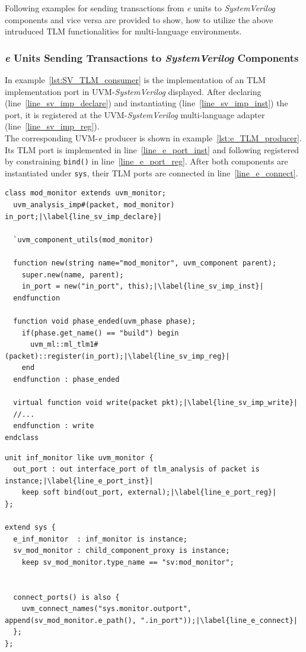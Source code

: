 Following examples for sending transactions from \textit{e} units to \emph{SystemVerilog} components and
vice versa are provided to show, how to utilize the above intruduced TLM functionalities for multi-language
environments.
\subsubsection{\textit{e} Units Sending Transactions to \emph{SystemVerilog} Components}
In example~\ref{lst:SV_TLM_consumer} is the implementation of an TLM implementation port in UVM-\emph{SystemVerilog}
displayed. After declaring (line~\ref{line_sv_imp_declare}) and instantiating (line~\ref{line_sv_imp_inst}) the port, it
is registered at the UVM-\emph{SystemVerilog} multi-language adapter (line~\ref{line_sv_imp_reg}).\\
The corresponding UVM-\textit{e} producer is shown in example~\ref{lst:e_TLM_producer}. Its TLM port is implemented in
line~\ref{line_e_port_inst} and following registered by constraining \lstinline$bind()$ in line~\ref{line_e_port_reg}.
After both components are instantiated under \lstinline$sys$, their TLM ports are connected in line~\ref{line_e_connect}.
\lstset{language=SystemVerilog, numbers = left, escapechar=|, breaklines=true}
\begin{lstlisting}[frame=htrbl, caption={SystemVerilog: consumer side of an TLM connection},
label={lst:SV_TLM_consumer}]
class mod_monitor extends uvm_monitor;
  uvm_analysis_imp#(packet, mod_monitor) in_port;|\label{line_sv_imp_declare}|
  
  `uvm_component_utils(mod_monitor)
  
  function new(string name="mod_monitor", uvm_component parent);
    super.new(name, parent);
    in_port = new("in_port", this);|\label{line_sv_imp_inst}|
  endfunction 
  
  function void phase_ended(uvm_phase phase);
    if(phase.get_name() == "build") begin
      uvm_ml::ml_tlm1#(packet)::register(in_port);|\label{line_sv_imp_reg}|
    end
  endfunction : phase_ended
  
  virtual function void write(packet pkt);|\label{line_sv_imp_write}|
  //...
  endfunction : write
endclass
\end{lstlisting}

\lstset{language=e, numbers = left, escapechar=|, breaklines=true}
\begin{lstlisting}[frame=htrbl, caption={\textit{e}: producer side of an TLM connection},
label={lst:e_TLM_producer}]
unit inf_monitor like uvm_monitor {
  out_port : out interface_port of tlm_analysis of packet is instance;|\label{line_e_port_inst}|
    keep soft bind(out_port, external);|\label{line_e_port_reg}|
};

extend sys {
  e_inf_monitor  : inf_monitor is instance;
  sv_mod_monitor : child_component_proxy is instance;
    keep sv_mod_monitor.type_name == "sv:mod_monitor";
  
    
  connect_ports() is also {
    uvm_connect_names("sys.monitor.outport", append(sv_mod_monitor.e_path(), ".in_port"));|\label{line_e_connect}|
  };  
};
\end{lstlisting}

